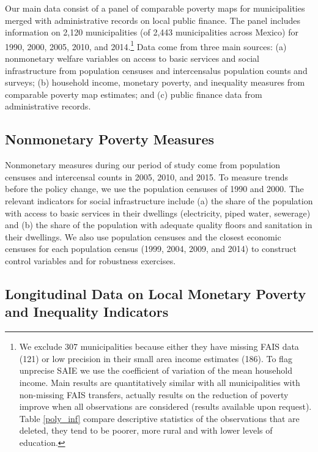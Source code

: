 \documentclass[dv_diss_main.tex]{subfiles}
\begin{document}
Our main data consist of a panel of comparable poverty maps for municipalities merged with administrative records on local public finance. The panel includes information on 2,120 municipalities (of 2,443 municipalities across Mexico) for 1990, 2000, 2005, 2010, and 2014.\footnote{ We exclude 307 municipalities because either they have missing FAIS data (121) or low precision in their small area income estimates (186). To flag unprecise SAIE we use the coefficient of variation of the mean household income. Main results are quantitatively similar with all municipalities with non-missing FAIS transfers, actually results on the reduction of poverty improve when all observations are considered (results available upon request). Table \ref{poly_inf} compare descriptive statistics of the observations that are deleted, they tend to be poorer, more rural and with lower levels of education.} Data come from three main sources: (a) nonmonetary welfare variables on access to basic services and social infrastructure from population censuses and intercensalus population counts and surveys; (b) household income, monetary poverty, and inequality measures from comparable poverty map estimates; and (c) public finance data from administrative records.

\subsection {Nonmonetary Poverty Measures} \label{subsec:non}

Nonmonetary measures during our period of study come from population censuses and intercensal counts in 2005, 2010, and 2015. To measure trends before the policy change, we use the population censuses of 1990 and 2000. The relevant indicators for social infrastructure include (a) the share of the population with access to basic services in their dwellings (electricity, piped water, sewerage) and (b) the share of the population with adequate quality floors and sanitation in their dwellings. We also use population censuses and the closest economic censuses for each population census (1999, 2004, 2009, and 2014) to construct control variables and for robustness exercises.

\subsection {Longitudinal Data on Local Monetary Poverty and Inequality Indicators}\label{subsec:monentary}
\end{document}
